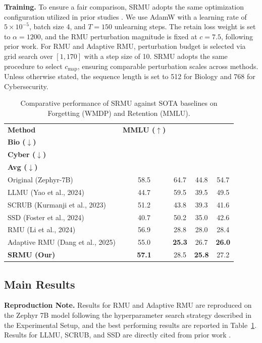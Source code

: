 \noindent\textbf{Training.}
To ensure a fair comparison, SRMU adopts the same optimization configuration utilized in prior studies \cite{10.1609/aaai.v39i22.34544,pmlr-v235-li24bc}.
We use AdamW with a learning rate of $5\times10^{-5}$, batch size 4, and $T=150$ unlearning steps.
The retain loss weight is set to $\alpha=1200$, and the RMU perturbation magnitude is fixed at $c=7.5$, following prior work.
For RMU and Adaptive RMU, perturbation budget is selected via grid search over $[1,170]$ with a step size of 10.
SRMU adopts the same procedure to select $c_{\text{map}}$, ensuring comparable perturbation scales across methods.
Unless otherwise stated, the sequence length is set to 512 for Biology and 768 for Cybersecurity.



\begin{table}[!h]
\centering
\caption{Comparative performance of SRMU against SOTA baselines on Forgetting (WMDP) and Retention (MMLU).}
\label{tab:overall_results}

\begin{tabular}{lcccc}
\toprule
\textbf{Method} 
& \textbf{MMLU ($\uparrow$)} 
& \makecell{\textbf{WMDP-}\\\textbf{Bio ($\downarrow$)}} 
& \makecell{\textbf{WMDP-}\\\textbf{Cyber ($\downarrow$)}} 
& \makecell{\textbf{WMDP}\\\textbf{Avg ($\downarrow$)}} \\
\midrule
Original (Zephyr-7B) & 58.5 & 64.7 & 44.8 & 54.7 \\
LLMU (Yao et al., 2024) & 44.7 & 59.5 & 39.5 & 49.5 \\
SCRUB (Kurmanji et al., 2023) & 51.2 & 43.8 & 39.3 & 41.6 \\
SSD (Foster et al., 2024) & 40.7 & 50.2 & 35.0 & 42.6 \\
\midrule
RMU (Li et al., 2024) & 56.9 & 28.8 & 28.0 & 28.4 \\
Adaptive RMU (Dang et al., 2025) & 55.0 & \textbf{25.3} & 26.7 & \textbf{26.0} \\
\textbf{SRMU (Our)} & \textbf{57.1} & 28.5 & \textbf{25.8} & 27.2 \\
\bottomrule
\end{tabular}
\end{table}
\subsection{Main Results}
\textbf{Reproduction Note.}
Results for RMU and Adaptive RMU are reproduced on the Zephyr 7B model following the hyperparameter search strategy described in the Experimental Setup, and the best performing results are reported in Table~\ref{tab:overall_results}.
Results for LLMU, SCRUB, and SSD are directly cited from prior work \cite{10.1609/aaai.v39i22.34544}.

